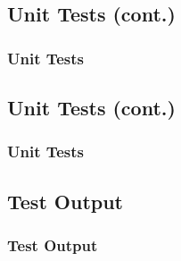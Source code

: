 \documentclass[mathserif,xcolor=dvipsnames,hyperref={bookmarks=true}]{beamer}
\begin{document}
    \subsection{Unit Tests (cont.)}
\begin{frame}[fragile]
\frametitle{Unit Tests}

\end{frame}

    \subsection{Unit Tests (cont.)}
\begin{frame}[fragile]
\frametitle{Unit Tests}

\end{frame}

    \subsection{Test Output}
\begin{frame}[fragile]
\frametitle{Test Output}

\end{frame}
\end{document}
